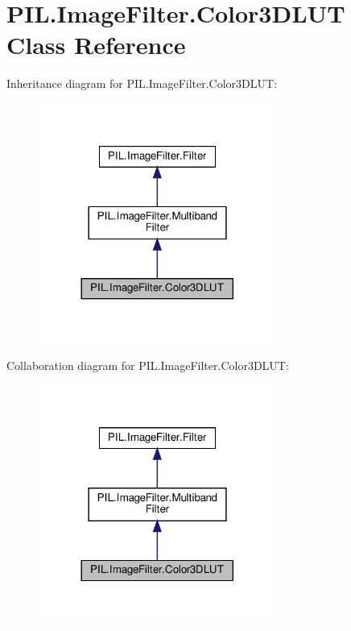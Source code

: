 \hypertarget{classPIL_1_1ImageFilter_1_1Color3DLUT}{}\section{P\+I\+L.\+Image\+Filter.\+Color3\+D\+L\+UT Class Reference}
\label{classPIL_1_1ImageFilter_1_1Color3DLUT}


Inheritance diagram for P\+I\+L.\+Image\+Filter.\+Color3\+D\+L\+UT\+:
\nopagebreak
\begin{figure}[H]
\begin{center}
\leavevmode
\includegraphics[width=221pt]{classPIL_1_1ImageFilter_1_1Color3DLUT__inherit__graph}
\end{center}
\end{figure}


Collaboration diagram for P\+I\+L.\+Image\+Filter.\+Color3\+D\+L\+UT\+:
\nopagebreak
\begin{figure}[H]
\begin{center}
\leavevmode
\includegraphics[width=221pt]{classPIL_1_1ImageFilter_1_1Color3DLUT__coll__graph}
\end{center}
\end{figure}
